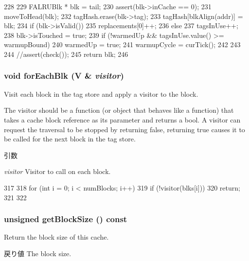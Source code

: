 \begin{DoxyCode}
228 {
229     FALRUBlk * blk = tail;
230     assert(blk->inCache == 0);
231     moveToHead(blk);
232     tagHash.erase(blk->tag);
233     tagHash[blkAlign(addr)] = blk;
234     if (blk->isValid()) {
235         replacements[0]++;
236     } else {
237         tagsInUse++;
238         blk->isTouched = true;
239         if (!warmedUp && tagsInUse.value() >= warmupBound) {
240             warmedUp = true;
241             warmupCycle = curTick();
242         }
243     }
244     //assert(check());
245     return blk;
246 }
\end{DoxyCode}
\hypertarget{classFALRU_a2f6fd1256bf2c210092c065ea65b83de}{
\subsubsection[{forEachBlk}]{\setlength{\rightskip}{0pt plus 5cm}void forEachBlk (V \& {\em visitor})}}
\label{classFALRU_a2f6fd1256bf2c210092c065ea65b83de}
Visit each block in the tag store and apply a visitor to the block.

The visitor should be a function (or object that behaves like a function) that takes a cache block reference as its parameter and returns a bool. A visitor can request the traversal to be stopped by returning false, returning true causes it to be called for the next block in the tag store.


\begin{DoxyParams}{引数}
\item[{\em visitor}]Visitor to call on each block. \end{DoxyParams}



\begin{DoxyCode}
317                                 {
318         for (int i = 0; i < numBlocks; i++) {
319             if (!visitor(blks[i]))
320                 return;
321         }
322     }
\end{DoxyCode}
\hypertarget{classFALRU_a38301abe4b3689f8ac7de5c13a046234}{
\subsubsection[{getBlockSize}]{\setlength{\rightskip}{0pt plus 5cm}unsigned getBlockSize () const}}
\label{classFALRU_a38301abe4b3689f8ac7de5c13a046234}
Return the block size of this cache. \begin{DoxyReturn}{戻り値}
The block size. 
\end{DoxyReturn}



